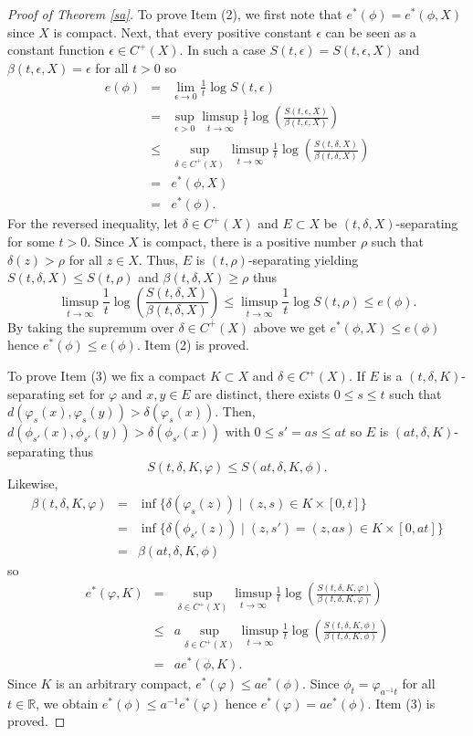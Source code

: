 \documentclass[11pt,letterpaper]{amsart}
\begin{document}
\begin{proof}[Proof of Theorem \ref{sa}]
To prove Item (2), we first note that $e^*(\phi)=e^*(\phi,X)$ since $X$ is compact.
Next, that every positive constant $\epsilon$ can be seen as a constant function $\epsilon\in C^+(X)$. In such a case $S(t,\epsilon)=S(t,\epsilon,X)$ and
$\beta(t,\epsilon,X)=\epsilon$ for all $t>0$ so
\begin{eqnarray*}
e(\phi)&=&\lim_{\epsilon\to0}\frac{1}t\log S(t,\epsilon)\\
&=&\sup_{\epsilon>0}\limsup_{t\to\infty}\frac{1}t\log \left(\frac{S(t,\epsilon,X)}{\beta(t,\epsilon,X)}\right)\\
&\leq& \sup_{\delta\in C^+(X)}\limsup_{t\to\infty}\frac{1}t\log\left(\frac{S(t,\delta,X)}{\beta(t,\delta,X)}\right)\\
&=&e^*(\phi,X)\\
&=&e^*(\phi).
\end{eqnarray*}
For the reversed inequality,
let $\delta\in C^+(X)$ and $E\subset X$ be $(t,\delta,X)$-separating for some $t>0$.
Since $X$ is compact, there is a positive number $\rho$ such that
$\delta(z)>\rho$ for all $z\in X$.
Thus, $E$ is $(t,\rho)$-separating yielding
$S(t,\delta,X)\leq S(t,\rho)$ and $\beta(t,\delta,X)\geq \rho$ thus
$$
\limsup_{t\to\infty}\frac{1}t\log\left(\frac{S(t,\delta,X)}{\beta(t,\delta,X)}\right)
\leq \limsup_{t\to\infty}\frac{1}t\log S(t,\rho)\leq e(\phi).
$$
By taking the supremum over $\delta\in C^+(X)$ above we get $e^*(\phi,X)\leq e(\phi)$ hence
$e^*(\phi)\leq e(\phi)$. Item (2) is proved.

To prove Item (3) we fix a compact $K\subset X$ and $\delta\in C^+(X)$.
If $E$ is a $(t,\delta,K)$-separating set for $\varphi$ and $x,y\in E$ are distinct, there exists $0\leq s\leq t$ such that $d(\varphi_s(x),\varphi_s(y))>\delta(\varphi_s(x))$.
Then, $d(\phi_{s'}(x),\phi_{s'}(y))>\delta(\phi_{s'}(x))$ with $0\leq s'=as\leq at$
so $E$ is $(at,\delta,K)$-separating thus
$$
S(t,\delta,K,\varphi)\leq S(at,\delta,K,\phi).
$$
Likewise,
\begin{eqnarray*}
\beta(t,\delta,K,\varphi)&=&\inf\{\delta(\varphi_s(z))\mid (z,s)\in K\times [0,t]\}\\
&=&\inf\{\delta(\phi_{s'}(z))\mid (z,s')=(z,as)\in K\times [0,at]\}\\
&=&\beta(at,\delta,K,\phi)
\end{eqnarray*}
so
\begin{eqnarray*}
e^*(\varphi,K)&=&\sup_{\delta\in C^+(X)}\limsup_{t\to\infty}\frac{1}t\log\left(\frac{S(t,\delta,K,\varphi)}{\beta(t,\delta,K,\varphi)}
\right)\\
&\leq& a\sup_{\delta\in C^+(X)}\limsup_{t\to\infty}\frac{1}t\log \left(\frac{S(t,\delta,K,\phi)}{\beta(t,\delta,K,\phi)}\right)\\
&=& ae^*(\phi,K).
\end{eqnarray*}
Since $K$ is an arbitrary compact, $e^*(\varphi)\leq ae^*(\phi)$.
Since $\phi_t=\varphi_{a^{-1}t}$ for all $t\in\mathbb{R}$, we obtain
$e^*(\phi)\leq a^{-1}e^*(\varphi)$ hence $e^*(\varphi)=ae^*(\phi)$.
Item (3) is proved.


\end{proof}
\end{document}
